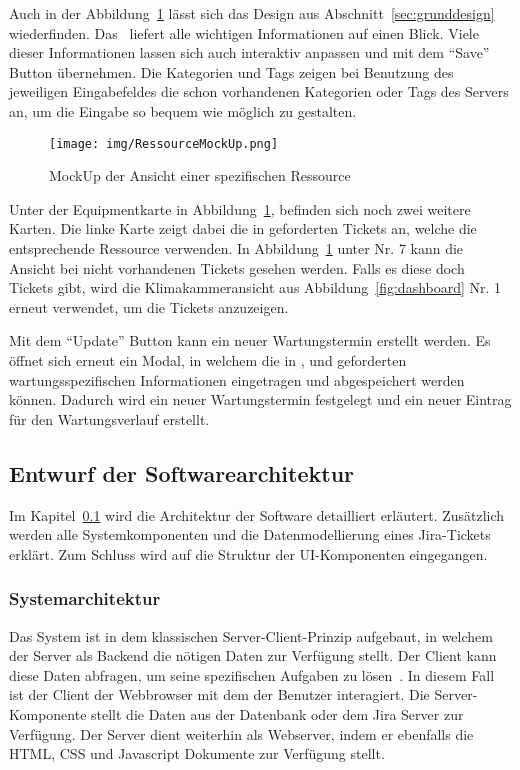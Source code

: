 Auch in der Abbildung~\ref{fig:ressource} lässt sich das Design aus Abschnitt~\ref{sec:grunddesign}
wiederfinden. Das~ liefert alle wichtigen Informationen
auf einen Blick. Viele dieser Informationen lassen sich auch interaktiv anpassen
und mit dem ``Save'' Button übernehmen. Die Kategorien und Tags zeigen bei Benutzung
des jeweiligen Eingabefeldes die schon vorhandenen Kategorien oder Tags des Servers
an, um die Eingabe so bequem wie möglich zu gestalten. 

\begin{figure}[H]
    \texttt{[image: img/RessourceMockUp.png]}
    \caption{MockUp der Ansicht einer spezifischen Ressource}\label{fig:ressource}
\end{figure}

Unter der Equipmentkarte in Abbildung~\ref{fig:ressource}, befinden sich noch zwei weitere Karten. Die linke Karte
zeigt dabei die in  geforderten Tickets an, welche die 
entsprechende Ressource verwenden. In Abbildung~\ref{fig:ressource} unter Nr. 7 
kann die Ansicht bei nicht vorhandenen Tickets gesehen werden. Falls es diese doch Tickets gibt, 
wird die Klimakammeransicht aus Abbildung~\ref{fig:dashboard} Nr. 1 erneut verwendet,
um die Tickets anzuzeigen.

Mit dem ``Update'' Button kann ein neuer Wartungstermin erstellt werden.
Es öffnet sich erneut ein Modal, in welchem die in , 
 und  geforderten wartungsspezifischen
Informationen eingetragen und abgespeichert werden können. Dadurch wird ein neuer
Wartungstermin festgelegt und ein neuer Eintrag für den Wartungsverlauf erstellt.


\subsection{Entwurf der Softwarearchitektur}\label{sec:swArchitectur}
Im Kapitel~\ref{sec:swArchitectur} wird die Architektur der Software detailliert 
erläutert. Zusätzlich werden alle Systemkomponenten und die 
Datenmodellierung eines Jira-Tickets erklärt. Zum Schluss wird auf die Struktur
der \gls{UI}-Komponenten eingegangen.

\subsubsection{Systemarchitektur}
Das System ist in dem klassischen Server-Client-Prinzip aufgebaut, in welchem der Server 
als \gls{Backend} die nötigen Daten zur Verfügung stellt. Der Client kann diese Daten
abfragen, um seine spezifischen Aufgaben zu lösen~\cite{Nie13}.
In diesem Fall ist der Client der Webbrowser mit dem der Benutzer interagiert. 
Die Server-Komponente stellt die Daten aus der Datenbank oder dem \gls{Jira} Server
zur Verfügung. Der Server dient weiterhin als Webserver, indem er ebenfalls die
\gls{HTML}, \gls{CSS} und Javascript Dokumente zur Verfügung stellt.\\

